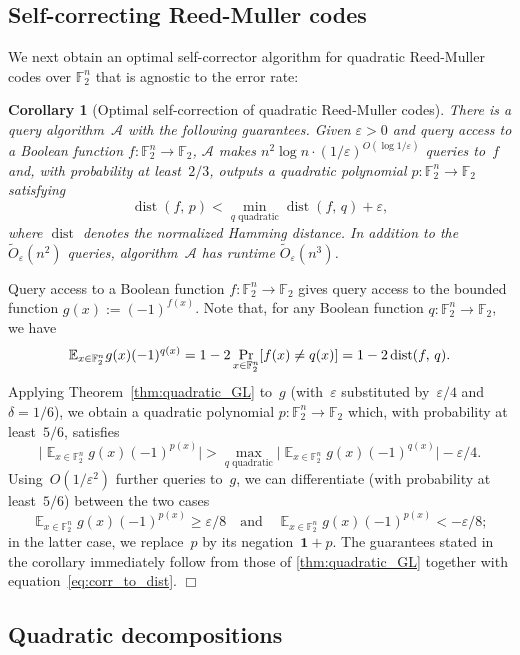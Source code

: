 \documentclass[11pt]{amsart}
\renewcommand{\Pr}{\mathop{\mbox{\rm Pr}}}
\newcommand{\Exp}{\mathop{\mathbb{E}}}
\newcommand{\E}{\mathbb{E}}
\newcommand{\F}{\mathbb{F}} %
\newcommand{\one}{\mathbf{1}}
\newcommand{\eps}{\varepsilon}
\DeclareMathOperator{\dist}{dist}
\newcommand{\A}{\mathcal A}
\theoremstyle{plain}
\newtheorem{corollary}[theorem]{Corollary}
\theoremstyle{definition}
\theoremstyle{remark}
\renewenvironment{proof}[1][]{
    	\begin{trivlist}
     	\item[\hspace{\labelsep}{\em\noindent Proof#1:\/}]}
     	{{\hfill$\Box$}
    	\end{trivlist}
  }
\begin{document}
\subsection{Self-correcting Reed-Muller codes}

We next obtain an optimal self-corrector algorithm for quadratic Reed-Muller codes over $\F_2^n$ that is agnostic to the error rate:

\begin{corollary}[Optimal self-correction of quadratic Reed-Muller codes] \label{cor:ReedMuller}
    There is a query algorithm~$\A$ with the following guarantees.
    Given $\eps>0$ and query access to a Boolean function $f: \F_2^n\to \F_2$, $\A$ makes $n^2 \log n\cdot (1/\eps)^{O(\log 1/\eps)}$ queries to~$f$ and, with probability at least~$2/3$, outputs a quadratic polynomial $p: \F_2^n \to \F_2$ satisfying
    $$\dist(f,\, p) < \min_{q \text{ quadratic}} \dist(f,\, q) + \eps,$$
    where $\dist$ denotes the normalized Hamming distance.
    In addition to the $\widetilde{O}_{\eps}(n^2)$ queries, algorithm~$\A$ has runtime $\widetilde{O}_{\eps}(n^3)$.
\end{corollary}

\begin{proof}
Query access to a Boolean function $f: \F_2^n \to \F_2$ gives query access to the bounded function $g(x) := (-1)^{f(x)}$.
Note that, for any Boolean function $q: \F_2^n \to \F_2$, we have
\begin{equation} \label{eq:corr_to_dist}
    \E_{x\in \F_2^n} g(x) (-1)^{q(x)} = 1 - 2\Pr_{x\in \F_2^n}[f(x) \neq q(x)] = 1-2\dist(f,\, q).
\end{equation}
Applying Theorem~\ref{thm:quadratic_GL} to~$g$ (with~$\eps$ substituted by~$\eps/4$ and $\delta=1/6$), we obtain a quadratic polynomial $p: \F_2^n \to \F_2$ which, with probability at least~$5/6$, satisfies
$$\big|\Exp_{x\in \F_2^n} g(x) (-1)^{p(x)}\big| > \max_{q \text{ quadratic}} \big|\Exp_{x\in \F_2^n} g(x) (-1)^{q(x)}\big| - \eps/4.$$
Using~$O(1/\eps^2)$ further queries to~$g$, we can differentiate (with probability at least~$5/6$) between the two cases
$$\Exp_{x\in \F_2^n} g(x) (-1)^{p(x)} \geq \eps/8 \quad \text{and} \quad \Exp_{x\in \F_2^n} g(x) (-1)^{p(x)} < -\eps/8;$$
in the latter case, we replace~$p$ by its negation~$\one+p$.
The guarantees stated in the corollary immediately follow from those of \cref{thm:quadratic_GL} together with equation~\eqref{eq:corr_to_dist}.
\end{proof}


\subsection{Quadratic decompositions}
\end{document}
